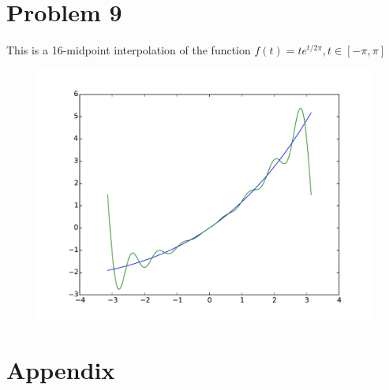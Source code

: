 \documentclass[paper=a4, fontsize=11pt]{scrartcl} %
\numberwithin{equation}{section} %
\numberwithin{figure}{section} %
\numberwithin{table}{section} %
\theoremstyle{definition}
\begin{document}
\section*{Problem 9}
This is a 16-midpoint interpolation of the function $f(t) = te^{t/2\pi}, t \in \left[ -\pi, \pi \right]$
\begin{figure}[!h]
	\centering
	\includegraphics[scale=0.5]{Problem9}
\end{figure}
\pagebreak

\section*{Appendix}

\pagebreak

\pagebreak

\end{document}

